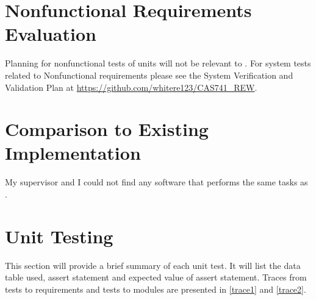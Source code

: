 \documentclass[12pt, titlepage]{article}
\begin{document}
\section{Nonfunctional Requirements Evaluation}

Planning for nonfunctional tests of units will not be relevant to \progname. 
For system tests related to Nonfunctional requirements please see the System 
Verification and Validation Plan at 
\url{https://github.com/whitere123/CAS741_REW}. 
	
\section{Comparison to Existing Implementation}	

My supervisor and I could not find any software that performs the same tasks as 
\progname. 

\section{Unit Testing} \label{unitest}

This section will provide a brief summary of each unit test. It will list the 
data table used, assert statement and expected value of assert statement. 
Traces from tests to requirements and tests to modules are presented in 
\ref{trace1} and \ref{trace2}. 
\end{document}
